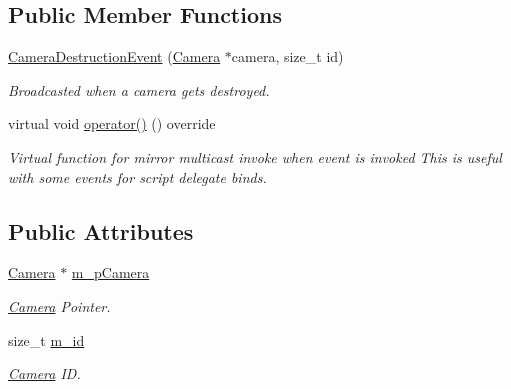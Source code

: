 \subsection*{Public Member Functions}
\begin{DoxyCompactItemize}
\item 
\hyperlink{classCameraDestructionEvent_add18fdf0c985ffd437a0b204b51111c3}{Camera\+Destruction\+Event} (\hyperlink{classCamera}{Camera} $\ast$camera, size\+\_\+t id)
\begin{DoxyCompactList}\small\item\em Broadcasted when a camera gets destroyed. \end{DoxyCompactList}\item 
\mbox{\label{classCameraDestructionEvent_a51b3e80cc36d6734c0758fb9b349b83e}} 
virtual void \hyperlink{classCameraDestructionEvent_a51b3e80cc36d6734c0758fb9b349b83e}{operator()} () override
\begin{DoxyCompactList}\small\item\em Virtual function for mirror multicast invoke when event is invoked This is useful with some events for script delegate binds. \end{DoxyCompactList}\end{DoxyCompactItemize}
\subsection*{Public Attributes}
\begin{DoxyCompactItemize}
\item 
\mbox{\label{classCameraDestructionEvent_a7051de5b07719f7730728ef27dce4df5}} 
\hyperlink{classCamera}{Camera} $\ast$ \hyperlink{classCameraDestructionEvent_a7051de5b07719f7730728ef27dce4df5}{m\+\_\+p\+Camera}
\begin{DoxyCompactList}\small\item\em \hyperlink{classCamera}{Camera} Pointer. \end{DoxyCompactList}\item 
\mbox{\label{classCameraDestructionEvent_a227991598328cd699e22e8e33b9bbe72}} 
size\+\_\+t \hyperlink{classCameraDestructionEvent_a227991598328cd699e22e8e33b9bbe72}{m\+\_\+id}
\begin{DoxyCompactList}\small\item\em \hyperlink{classCamera}{Camera} ID. \end{DoxyCompactList}\end{DoxyCompactItemize}
